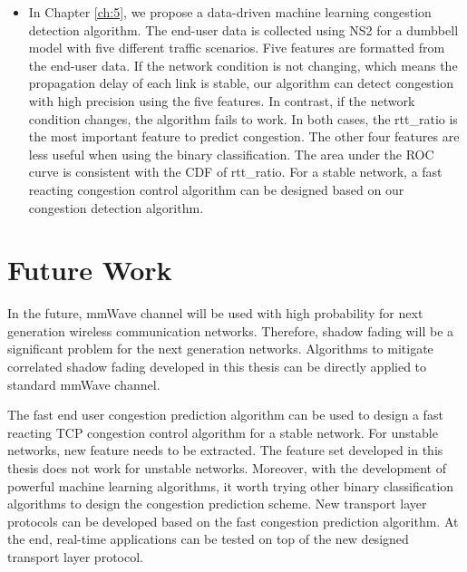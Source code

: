 \begin{itemize}
 \item In Chapter \ref{ch:5}, we propose a data-driven machine learning congestion detection algorithm. The end-user data is collected using NS2 for a dumbbell model with five different traffic scenarios. Five features are formatted from the end-user data. If the network condition is not changing, which means the propagation delay of each link is stable, our algorithm can detect congestion with high precision using the five features. In contrast, if the network condition changes, the algorithm fails to work. In both cases, the rtt\_ratio is the most important feature to predict congestion. The other four features are less useful when using the binary classification. The area under the ROC curve is consistent with the CDF of rtt\_ratio. For a stable network, a fast reacting congestion control algorithm can be designed based on our congestion detection algorithm.

 \end{itemize}
 \section{Future Work}
 \par In the future, mmWave channel will be used with high probability for next generation wireless communication networks. Therefore, shadow fading will be a significant problem for the next generation networks. Algorithms to mitigate correlated shadow fading developed in this thesis can be directly applied to standard mmWave channel. 
 \par The fast end user congestion prediction algorithm can be used to design a fast reacting TCP congestion control algorithm for a stable network. For unstable networks, new feature needs to be extracted. The feature set developed in this thesis does not work for unstable networks. Moreover, with the development of powerful machine learning algorithms, it worth trying other binary classification algorithms to design the congestion prediction scheme. New transport layer protocols can be developed based on the fast congestion prediction algorithm. At the end, real-time applications can be tested on top of the new designed transport layer protocol.
